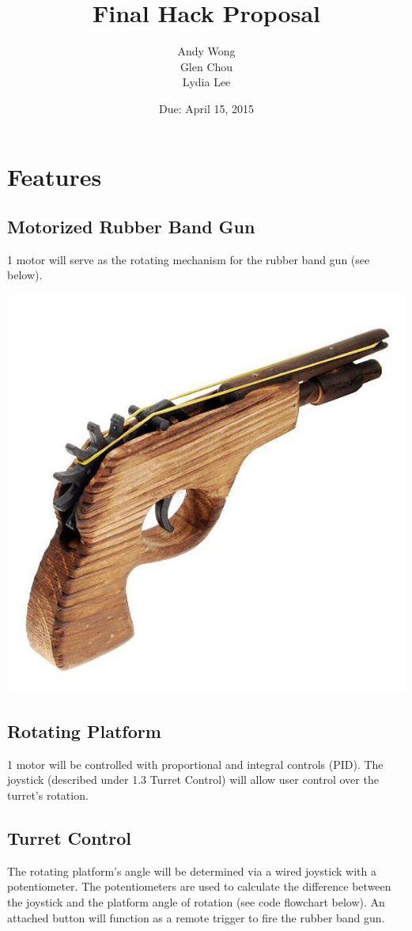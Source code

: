 \documentclass[a4paper, 11pt]{article}
\title{Final Hack Proposal}\author{Andy Wong\\Glen Chou\\Lydia Lee}\date{Due: April 15, 2015}
\begin{document}
\pagestyle{fancy}
\fancyhf{}
\maketitle
\tableofcontents
\newpage
\section{Features}
	\subsection{Motorized Rubber Band Gun}
		1 motor will serve as the rotating mechanism for the rubber band gun (see below).
		\begin{center}
			\includegraphics[scale=.45]{rubber-band-gun}
		\end{center}
	\subsection{Rotating Platform}
		1 motor will be controlled with proportional and integral controls (PID).  The joystick (described under 1.3 Turret Control) will allow user control over the turret's rotation. 
	\subsection{Turret Control}
		The rotating platform's angle will be determined via a wired joystick with a potentiometer.  The potentiometers are used to calculate the difference between the joystick and the platform angle of rotation (see code flowchart below).  An attached button will function as a remote trigger to fire the rubber band gun.
\newpage
\end{document}
